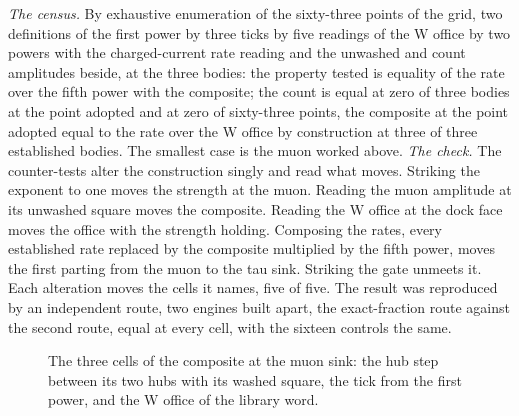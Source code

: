 \begin{chproof}
\textit{The census.} By exhaustive enumeration of the sixty-three points of the grid, two definitions of the first power by three ticks by five readings of the W office by two powers with the charged-current rate reading and the unwashed and count amplitudes beside, at the three bodies: the property tested is equality of the rate over the fifth power with the composite; the count is equal at zero of three bodies at the point adopted and at zero of sixty-three points, the composite at the point adopted equal to the rate over the W office by construction at three of three established bodies. The smallest case is the muon worked above.
\textit{The check.} The counter-tests alter the construction singly and read what moves. Striking the exponent to one moves the strength at the muon. Reading the muon amplitude at its unwashed square moves the composite. Reading the W office at the dock face moves the office with the strength holding. Composing the rates, every established rate replaced by the composite multiplied by the fifth power, moves the first parting from the muon to the tau sink. Striking the gate unmeets it. Each alteration moves the cells it names, five of five. The result was reproduced by an independent route, two engines built apart, the exact-fraction route against the second route, equal at every cell, with the sixteen controls the same.
\begin{figure}[h]\centering{}\caption{The three cells of the composite at the muon sink: the hub step between its two hubs with its washed square, the tick from the first power, and the W office of the library word.}\end{figure}
\end{chproof}
